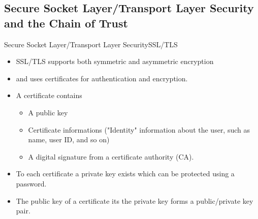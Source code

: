 ﻿\subsection{Secure Socket Layer/Transport Layer Security and the Chain of Trust}

\begin{frame}{\alert{S}ecure \alert{S}ocket \alert{L}ayer/\alert{T}ransport \alert{L}ayer \alert{S}ecurity}{SSL/TLS}
    \begin{itemize}
        \item \alert{SSL/TLS} supports both \alert{symmetric} and \alert{asymmetric} encryption
        \item and uses \alert{certificates} for \alert{authentication} and \alert{encryption}.
        \item A certificate contains
        \begin{itemize}
            \item A \alert{public key}
            \item Certificate \alert{informations} ("Identity" information about the user, such as name, user ID, and so on)
            \item A \alert{digital signature} from a \alert{certificate authority (CA)}.
        \end{itemize}
        \item To \alert{each} certificate a \alert{private key} exists which can be protected using a password.
        \item The \alert{public key} of a certificate its the \alert{private key} forms a public/private key pair.
    \end{itemize}
\end{frame}
